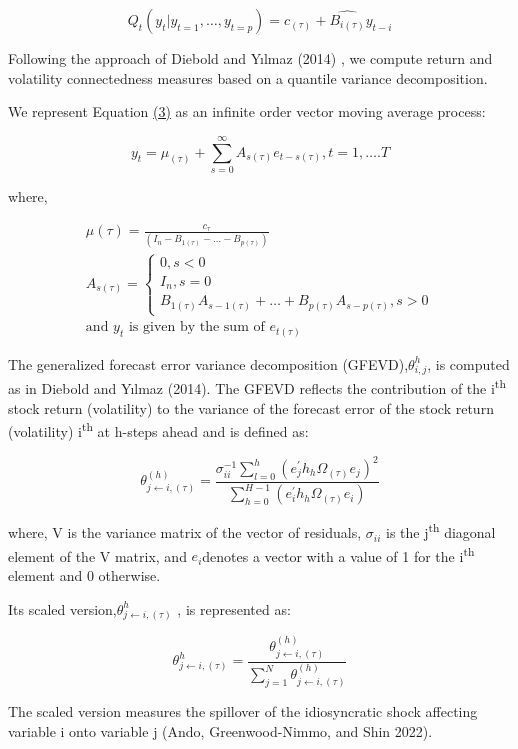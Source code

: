 \documentclass[
  letterpaper,
  DIV=11,
  numbers=noendperiod]{scrartcl}
\begin{document}
\[
Q_t(y_t |y_{t=1},\dots,y_{t=p})=c_{(\tau)}+\hat{B_{i(\tau)}} y_{t-i}
\]

Following the approach of Diebold and Yılmaz (2014) , we compute return
and volatility connectedness measures based on a quantile variance
decomposition.

We represent Equation
\href{https://www.sciencedirect.com/science/article/pii/S1062940819304085\#e0015}{(3)}
as an infinite order vector moving average process:

\[
y_t=\mu_{(\tau)}+\sum_{s=0}^{\infty}A_{s(\tau)}e_{t-s(\tau)}, t=1,\dots.T
\]

where,

\begin{align*}
\mu{(\tau)}= \frac{c_{\tau}}{\left (I_n-B_{1(\tau)}-\dots-B_{p(\tau)} \right)} \\
A_{s(\tau)}= \begin{cases} 0, s<0 \\ I_n, s=0 \\ B_{1(\tau)}A_{s-1(\tau)}+\dots+B_{p(\tau)}A_{s-p(\tau)}, s>0 \end{cases} \\
\text{and $y_t$ is given by the sum of $e_{t(\tau)}$}
\end{align*}

The generalized forecast error variance decomposition
(GFEVD),\(\theta^h_{i,j}\), is computed as in Diebold and Yılmaz (2014).
The GFEVD reflects the contribution of the i\textsuperscript{th} stock
return (volatility) to the variance of the forecast error of the stock
return (volatility) i\textsuperscript{th} at h-steps ahead and is
defined as:

\[
\theta^{(h)}_{j \leftarrow i,(\tau)}= \frac{\sigma_{ii}^{-1}\sum_{l=0}^{h}(e_j^{'}h_h \Omega_{(\tau)} e_j)^2}{\sum_{h=0}^{H-1}(e_i^{'}h_h \Omega_{(\tau)} e_i)}
\]

where, V is the variance matrix of the vector of residuals,
\(\sigma_{ii}\) is the j\textsuperscript{th} diagonal element of the V
matrix, and \(e_i\)denotes a vector with a value of 1 for the
i\textsuperscript{th} element and 0 otherwise.

Its scaled version,\(\theta_{j\leftarrow i,(\tau)}^h\) , is represented
as:

\[
\theta_{j\leftarrow i,(\tau)}^h=\frac{\theta^{(h)}_{j \leftarrow i,(\tau)}}{\sum_{j=1}^N \theta^{(h)}_{j \leftarrow i,(\tau)}}
\]

The scaled version measures the spillover of the idiosyncratic shock
affecting variable i onto variable j (Ando, Greenwood-Nimmo, and Shin
2022).
\end{document}
